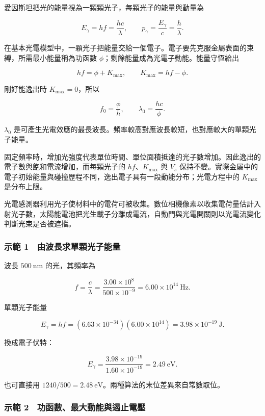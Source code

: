 \documentclass[11pt,a4paper]{article}
\begin{document}
愛因斯坦把光的能量視為一顆顆光子，每顆光子的能量與動量為

\[
E_\gamma=hf=\frac{hc}{\lambda},
\qquad
p_\gamma=\frac{E_\gamma}{c}=\frac{h}{\lambda}.
\]

在基本光電模型中，一顆光子把能量交給一個電子。電子要先克服金屬表面的束縛，所需最小能量稱為功函數 \(\phi\)；剩餘能量成為光電子動能。能量守恆給出

\[
\boxed{hf=\phi+K_{\max}},
\qquad
\boxed{K_{\max}=hf-\phi}.
\]

剛好能逸出時 \(K_{\max}=0\)，所以

\[
\boxed{f_0=\frac{\phi}{h}},
\qquad
\boxed{\lambda_0=\frac{hc}{\phi}}.
\]

\(\lambda_0\) 是可產生光電效應的最長波長。頻率較高對應波長較短，也對應較大的單顆光子能量。

固定頻率時，增加光強度代表單位時間、單位面積抵達的光子數增加。因此逸出的電子數與飽和電流增加，而每顆光子的 \(hf\)、\(K_{\max}\) 與 \(V_s\) 保持不變。實際金屬中的電子初始能量與碰撞歷程不同，逸出電子具有一段動能分布；光電方程中的 \(K_{\max}\) 是分布上限。

光電感測器利用光子使材料中的電荷可被收集。數位相機像素以收集電荷量估計入射光子數，太陽能電池把光生載子分離成電流，自動門與光電開關則以光電流變化判斷光束是否被遮擋。

\subsubsection{示範 1　由波長求單顆光子能量}\label{ux793aux7bc4-1-ux7531ux6ce2ux9577ux6c42ux55aeux9846ux5149ux5b50ux80fdux91cf}

波長 \(500\ \mathrm{nm}\) 的光，其頻率為

\[
f=\frac{c}{\lambda}
=\frac{3.00\times10^8}{500\times10^{-9}}
=6.00\times10^{14}\ \mathrm{Hz}.
\]

單顆光子能量

\[
E_\gamma=hf
=(6.63\times10^{-34})(6.00\times10^{14})
=3.98\times10^{-19}\ \mathrm J.
\]

換成電子伏特：

\[
E_\gamma=\frac{3.98\times10^{-19}}{1.60\times10^{-19}}
=2.49\ \mathrm{eV}.
\]

也可直接用 \(1240/500=2.48\ \mathrm{eV}\)。兩種算法的末位差異來自常數取位。

\subsubsection{示範 2　功函數、最大動能與遏止電壓}\label{ux793aux7bc4-2-ux529fux51fdux6578ux6700ux5927ux52d5ux80fdux8207ux904fux6b62ux96fbux58d3}
\end{document}
